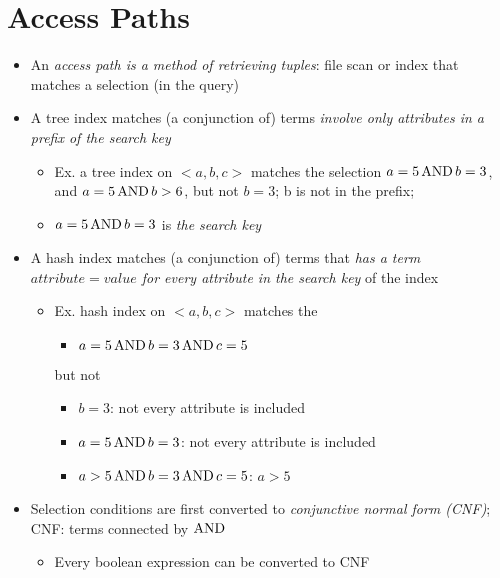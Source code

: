 \section{Access Paths}

  \begin{itemize}
    \item An \emph{access path is a method of retrieving tuples}: file scan or
    index that matches a selection (in the query)
    \item A tree index matches (a conjunction of) terms \emph{involve only attributes
    in a prefix of the search key}
    \begin{itemize}
      \item Ex. a tree index on $ <a, b, c> $ matches the selection
      $ a = 5 \operatorname{AND} b = 3 $, and $ a = 5 \operatorname{AND} b > 6 $, but
      not $ b = 3 $; b is not in the prefix;
      \item $ a = 5 \operatorname{AND} b = 3 $ is \emph{the search key}
    \end{itemize}

    \item A hash index matches (a conjunction of) terms that \emph{has a term
    $ attribute = value $ for every attribute in the search key} of the index
    \begin{itemize}
      \item Ex. hash index on $ <a, b, c> $ matches the
      \begin{itemize}
        \item $ a = 5 \operatorname{AND} b = 3 \operatorname{AND} c = 5 $
      \end{itemize}
      but not
      \begin{itemize}
        \item $ b = 3 $: not every attribute is included
        \item $ a = 5 \operatorname{AND} b = 3 $: not every attribute is included
        \item $ a > 5 \operatorname{AND} b = 3 \operatorname{AND} c = 5 $: $ a > 5 $
      \end{itemize}
    \end{itemize}

    \item Selection conditions are first converted to \emph{conjunctive normal form (CNF)};
    CNF: terms connected by $ \operatorname{AND} $
    \begin{itemize}
      \item Every boolean expression can be converted to CNF
    \end{itemize}
  \end{itemize}

